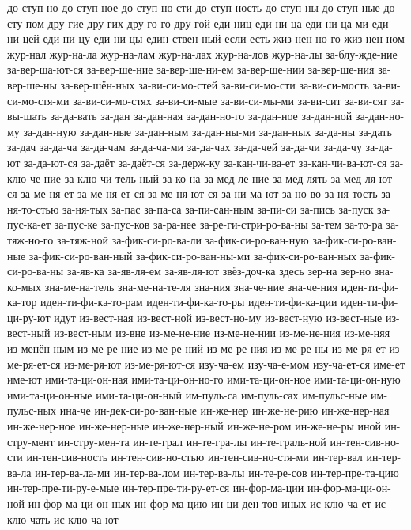 {до-ступ-но
до-ступ-ное
до-ступ-но-сти
до-ступ-ность
до-ступ-ны
до-ступ-ные
до-сту-пом
дру-гие
дру-гих
дру-го-го
дру-гой
еди-ниц
еди-ни-ца
еди-ни-ца-ми
еди-ни-цей
еди-ни-цу
еди-ни-цы
един-ствен-ный
если
есть
жиз-нен-но-го
жиз-нен-ном
жур-нал
жур-на-ла
жур-на-лам
жур-на-лах
жур-на-лов
жур-на-лы
за-блу-жде-ние
за-вер-ша-ют-ся
за-вер-ше-ние
за-вер-ше-ни-ем
за-вер-ше-нии
за-вер-ше-ния
за-вер-ше-ны
за-вер-шён-ных
за-ви-си-мо-стей
за-ви-си-мо-сти
за-ви-си-мость
за-ви-си-мо-стя-ми
за-ви-си-мо-стях
за-ви-си-мые
за-ви-си-мы-ми
за-ви-сит
за-ви-сят
за-вы-шать
за-да-вать
за-дан
за-дан-ная
за-дан-но-го
за-дан-ное
за-дан-ной
за-дан-но-му
за-дан-ную
за-дан-ные
за-дан-ным
за-дан-ны-ми
за-дан-ных
за-да-ны
за-дать
за-дач
за-да-ча
за-да-чам
за-да-ча-ми
за-да-чах
за-да-чей
за-да-чи
за-да-чу
за-да-ют
за-да-ют-ся
за-даёт
за-даёт-ся
за-держ-ку
за-кан-чи-ва-ет
за-кан-чи-ва-ют-ся
за-клю-че-ние
за-клю-чи-тель-ный
за-ко-на
за-мед-ле-ние
за-мед-лять
за-мед-ля-ют-ся
за-ме-ня-ет
за-ме-ня-ет-ся
за-ме-ня-ют-ся
за-ни-ма-ют
за-но-во
за-ня-тость
за-ня-то-стью
за-ня-тых
за-пас
за-па-са
за-пи-сан-ным
за-пи-си
за-пись
за-пуск
за-пус-ка-ет
за-пус-ке
за-пус-ков
за-ра-нее
за-ре-ги-стри-ро-ва-ны
за-тем
за-то-ра
за-тяж-но-го
за-тяж-ной
за-фик-си-ро-ва-ли
за-фик-си-ро-ван-ную
за-фик-си-ро-ван-ные
за-фик-си-ро-ван-ный
за-фик-си-ро-ван-ны-ми
за-фик-си-ро-ван-ных
за-фик-си-ро-ва-ны
за-яв-ка
за-яв-ля-ем
за-яв-ля-ют
звёз-доч-ка
здесь
зер-на
зер-но
зна-ко-мых
зна-ме-на-тель
зна-ме-на-те-ля
зна-ния
зна-че-ние
зна-че-ния
иден-ти-фи-ка-тор
иден-ти-фи-ка-то-рам
иден-ти-фи-ка-то-ры
иден-ти-фи-ка-ции
иден-ти-фи-ци-ру-ют
идут
из-вест-ная
из-вест-ной
из-вест-но-му
из-вест-ную
из-вест-ные
из-вест-ный
из-вест-ным
из-вне
из-ме-не-ние
из-ме-не-нии
из-ме-не-ния
из-ме-няя
из-менён-ным
из-ме-ре-ние
из-ме-ре-ний
из-ме-ре-ния
из-ме-ре-ны
из-ме-ря-ет
из-ме-ря-ет-ся
из-ме-ря-ют
из-ме-ря-ют-ся
изу-ча-ем
изу-ча-е-мом
изу-ча-ет-ся
име-ет
име-ют
ими-та-ци-он-ная
ими-та-ци-он-но-го
ими-та-ци-он-ное
ими-та-ци-он-ную
ими-та-ци-он-ные
ими-та-ци-он-ный
им-пуль-са
им-пуль-сах
им-пульс-ные
им-пульс-ных
ина-че
ин-дек-си-ро-ван-ные
ин-же-нер
ин-же-не-рию
ин-же-нер-ная
ин-же-нер-ное
ин-же-нер-ные
ин-же-нер-ный
ин-же-не-ром
ин-же-не-ры
иной
ин-стру-мент
ин-стру-мен-та
ин-те-грал
ин-те-гра-лы
ин-те-граль-ной
ин-тен-сив-но-сти
ин-тен-сив-ность
ин-тен-сив-но-стью
ин-тен-сив-но-стя-ми
ин-тер-вал
ин-тер-ва-ла
ин-тер-ва-ла-ми
ин-тер-ва-лом
ин-тер-ва-лы
ин-те-ре-сов
ин-тер-пре-та-цию
ин-тер-пре-ти-ру-е-мые
ин-тер-пре-ти-ру-ет-ся
ин-фор-ма-ции
ин-фор-ма-ци-он-ной
ин-фор-ма-ци-он-ных
ин-фор-ма-цию
ин-ци-ден-тов
иных
ис-клю-ча-ет
ис-клю-чать
ис-клю-ча-ют
}
